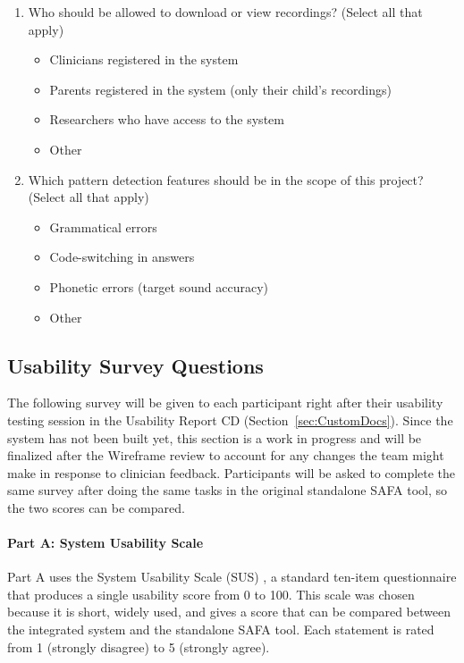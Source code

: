 \documentclass[12pt, titlepage]{article}
\renewcommand{\_}{\oldunderscore\allowbreak}
\begin{document}
\begin{enumerate}
\begin{itemize}
    \item Clinician notes per question
    \item Clinician notes for the whole assessment
    \item All flagged potential interference
    \item Final diagnosis/results
    \item Other
  \end{itemize}
  \item Who should be allowed to download or view recordings? (Select all that apply)
  \begin{itemize}
    \item Clinicians registered in the system
    \item Parents registered in the system (only their child's recordings)
    \item Researchers who have access to the system
    \item Other
  \end{itemize}
  \item Which pattern detection features should be in the scope of this project? (Select all that apply)
  \begin{itemize}
    \item Grammatical errors
    \item Code-switching in answers
    \item Phonetic errors (target sound accuracy)
    \item Other
  \end{itemize}
\end{enumerate}

\subsection{Usability Survey Questions} \label{sec:UsabilitySurvey}

The following survey will be given to each participant right after their usability testing session in the Usability Report CD (Section~\ref{sec:CustomDocs}).
Since the system has not been built yet, this section is a work in progress and will be finalized after the Wireframe review to account for any changes the team might make in response to clinician feedback.
Participants will be asked to complete the same survey after doing the same tasks in the original standalone SAFA tool, so the two scores can be compared.

\paragraph{Part A: System Usability Scale}
Part A uses the System Usability Scale (SUS) \citep{Brooke_SUS_1996}, a standard ten-item questionnaire that produces a single usability score from 0 to 100.
This scale was chosen because it is short, widely used, and gives a score that can be compared between the integrated system and the standalone SAFA tool.
Each statement is rated from 1 (strongly disagree) to 5 (strongly agree).
\end{document}
